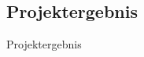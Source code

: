 \subsection{Projektergebnis}
\begin{frame}{Projektergebnis}

 \begin{overlayarea}{\textwidth}{.67\textheight}
   \vspace{3ex}
	\begin{figure}[b]
	\end{figure}
 \end{overlayarea}
 
 \begin{overlayarea}{\textwidth}{.33\textheight}
 \end{overlayarea}

\end{frame}
